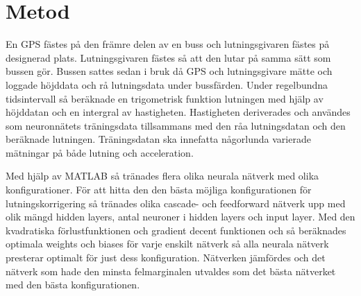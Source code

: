 \section{Metod}

En GPS fästes på den främre delen av en buss och lutningsgivaren fästes på designerad plats. Lutningsgivaren fästes så att den lutar på samma sätt som bussen gör. Bussen sattes sedan i bruk då GPS och lutningsgivare mätte och loggade höjddata och rå lutningsdata under bussfärden. Under regelbundna tidsintervall så beräknade en trigometrisk funktion lutningen med hjälp av höjddatan och en intergral av hastigheten. %
Hastigheten deriverades och användes som neuronnätets träningsdata tillsammans med den råa lutningsdatan och den beräknade lutningen.
Träningsdatan ska innefatta någorlunda varierade mätningar på både lutning och acceleration.

Med hjälp av MATLAB så tränades flera olika neurala nätverk med olika konfigurationer. %
För att hitta den den bästa möjliga konfigurationen för lutningskorrigering så tränades olika cascade- och feedforward 
nätverk upp med olik mängd hidden layers, antal neuroner i hidden layers och input layer. Med den kvadratiska förlustfunktionen och gradient decent funktionen och så beräknades optimala weights och biases för varje enskilt nätverk så alla neurala nätverk presterar optimalt för just dess konfiguration.
Nätverken jämfördes
och det nätverk som hade den minsta felmarginalen utvaldes som det bästa nätverket med den bästa konfigurationen.


